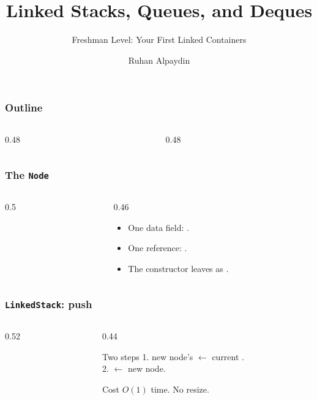 \documentclass[aspectratio=169,10pt,compress]{beamer}
\title{Linked Stacks, Queues, and Deques}
\subtitle{Freshman Level: Your First Linked Containers}
\author[Bingol]{Ruhan Alpaydin}
\institute[FCIS]{Faculty of Computer and Information Sciences\\Yeditepe University}
\date{{\tiny \hbTimeStamp}}
\begin{document}
\begin{frame}[t,fragile]\titlepage\end{frame}

\begin{frame}[t,fragile]\frametitle{Outline}
  \begin{columns}[T]
    \begin{column}{0.48\textwidth}\tableofcontents[sections={1-3},hideallsubsections]\end{column}
    \begin{column}{0.48\textwidth}\tableofcontents[sections={4-5},hideallsubsections]\end{column}
  \end{columns}
\end{frame}

\begin{frame}[t,fragile]\frametitle{The \texttt{Node}}
  \begin{columns}[T]
    \begin{column}{0.5\textwidth}
    \end{column}
    \begin{column}{0.46\textwidth}
      \begin{itemize}\small
        \item One data field: .
        \item One reference: .
        \item The constructor leaves  as .
      \end{itemize}
    \end{column}
  \end{columns}
\end{frame}

\begin{frame}[t,fragile]\frametitle{\texttt{LinkedStack}: push}
  \begin{columns}[T]
    \begin{column}{0.52\textwidth}
    \end{column}
    \begin{column}{0.44\textwidth}
      \begin{block}{Two steps}
        \small
        1. new node's  $\gets$ current .\\
        2.  $\gets$ new node.
      \end{block}
      \begin{block}{Cost}
        \small
        $O(1)$ time. No resize.
      \end{block}
    \end{column}
  \end{columns}
\end{frame}
\end{document}
